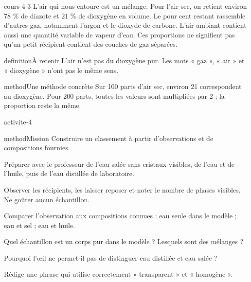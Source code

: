 \documentclass[12pt,twoside,openany]{book}
\begin{document}
\label{ch-4-cours-3}
\begin{pcFiche}{cours-4-3}
L’air qui nous entoure est un mélange. Pour l’air sec, on retient environ 78 \% de diazote et 21 \% de dioxygène en volume. Le pour cent restant rassemble d’autres gaz, notamment l’argon et le dioxyde de carbone. L’air ambiant contient aussi une quantité variable de vapeur d’eau. Ces proportions ne signifient pas qu’un petit récipient contient des couches de gaz séparées.\par
{}
\begin{pcEncadre}{definition}{À retenir}
L’air n’est pas du dioxygène pur. Les mots « gaz », « air » et « dioxygène » n’ont pas le même sens.\par
\end{pcEncadre}
\begin{pcEncadre}{method}{Une méthode concrète}
Sur 100 parts d’air sec, environ 21 correspondent au dioxygène. Pour 200 parts, toutes les valeurs sont multipliées par 2 ; la proportion reste la même.\par
\end{pcEncadre}
\end{pcFiche}
\label{ch-4-activite}
\begin{pcFiche}{activite-4}
\begin{pcEncadre}{method}{Mission}
Construire un classement à partir d’observations et de compositions fournies.\par
\end{pcEncadre}
\begin{questions}
\item Préparer avec le professeur de l’eau salée sans cristaux visibles, de l’eau et de l’huile, puis de l’eau distillée de laboratoire.
\item Observer les récipients, les laisser reposer et noter le nombre de phases visibles. Ne goûter aucun échantillon.
\item Comparer l’observation aux compositions connues : eau seule dans le modèle ; eau et sel ; eau et huile.
\end{questions}
\begin{questions}
\item Quel échantillon est un corps pur dans le modèle ? Lesquels sont des mélanges ?
\item Pourquoi l’œil ne permet-il pas de distinguer eau distillée et eau salée ?
\item Rédige une phrase qui utilise correctement « transparent » et « homogène ».
\end{questions}
\end{pcFiche}
\end{document}
